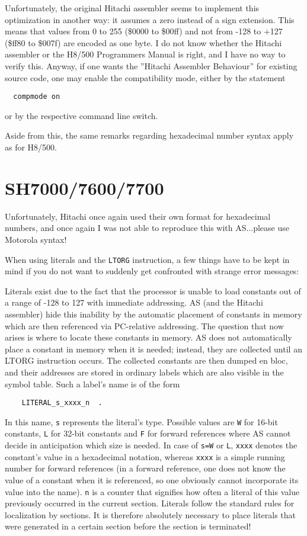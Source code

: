 \documentclass[12pt,twoside]{report}
\newcommand{\tty}[1]{{\tt #1}}
\begin{document}
Unfortunately, the original Hitachi assembler seems to implement this optimization
in another way: it assumes a zero instead of a sign extension.  This means that
values from 0 to 255 (\$0000 to \$00ff) and not from -128 to +127 (\$ff80 to
\$007f) are encoded as one byte.  I do not know whether the Hitachi assembler
or the H8/500 Programmers Manual is right, and I have no way to verify this.
Anyway, if one wants the ''Hitachi Assembler Behaviour'' for existing source
code, one may enable the compatibility mode, either by the statement
\begin{verbatim}
  compmode on
\end{verbatim}
or by the respective command line switch.

Aside from this, the same remarks regarding hexadecimal number syntax apply
as for H8/500.


\section{SH7000/7600/7700}

Unfortunately, Hitachi once again used their own format for
hexadecimal numbers, and once again I was not able to reproduce this
with AS...please use Motorola syntax!

When using literals and the \tty{LTORG} instruction, a few things have to
be kept in mind if you do not want to suddenly get confronted with strange
error messages:

Literals exist due to the fact that the processor is unable to load
constants out of a range of -128 to 127 with immediate addressing.
AS (and the Hitachi assembler) hide this inability by the automatic
placement of constants in memory which are then referenced via
PC-relative addressing.  The question that now arises is where to
locate these constants in memory.  AS does not automatically place a
constant in memory when it is needed; instead, they are collected
until an LTORG instruction occurs.  The collected constants are then
dumped en bloc, and their addresses are stored in ordinary labels
which are also visible in the symbol table.  Such a label's name is
of the form
\begin{verbatim}
    LITERAL_s_xxxx_n  .
\end{verbatim}
In this name, \tty{s} represents the literal's type.  Possible values are
\tty{W} for 16-bit constants, \tty{L} for 32-bit constants and \tty{F} for
forward references where AS cannot decide in anticipation which size is
needed.  In case of \tty{s=W} or \tty{L}, \tty{xxxx} denotes the
constant's value in a hexadecimal notation, whereas \tty{xxxx} is a simple
running number for forward references (in a forward reference, one does
not know the value of a constant when it is referenced, so one obviously
cannot incorporate its value into the name).  \tty{n} is a counter that
signifies how often a literal of this value previously occurred in the
current section.  Literals follow the standard rules for localization by
sections.  It is therefore absolutely necessary to place literals that
were generated in a certain section before the section is terminated!
\end{document}

